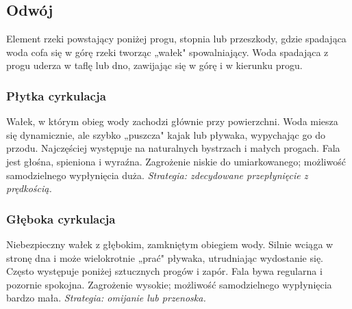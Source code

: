 \subsection{Odwój}

Element rzeki powstający poniżej progu, stopnia lub przeszkody, gdzie spadająca woda cofa się w górę rzeki tworząc „wałek" spowalniający. Woda spadająca z progu uderza w taflę lub dno, zawijając się w górę i w kierunku progu.

\subsubsection*{Płytka cyrkulacja}

Wałek, w którym obieg wody zachodzi głównie przy powierzchni. Woda miesza się dynamicznie, ale szybko „puszcza" kajak lub pływaka, wypychając go do przodu. Najczęściej występuje
na naturalnych bystrzach i małych progach. Fala jest głośna, spieniona i wyraźna. Zagrożenie niskie do umiarkowanego; możliwość samodzielnego wypłynięcia duża. \emph{Strategia: zdecydowane przepłynięcie z prędkością.}

\subsubsection*{Głęboka cyrkulacja}

Niebezpieczny wałek z głębokim, zamkniętym obiegiem wody. Silnie wciąga w stronę dna i może wielokrotnie „prać" pływaka, utrudniając wydostanie się. Często występuje poniżej
sztucznych progów i zapór. Fala bywa regularna i pozornie spokojna. Zagrożenie wysokie; możliwość samodzielnego wypłynięcia bardzo mała. \emph{Strategia: omijanie lub przenoska.}

